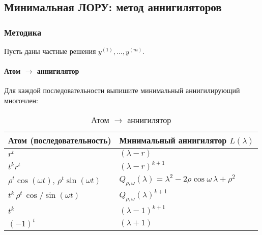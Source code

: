 \subsection{Минимальная ЛОРУ: метод аннигиляторов}\label{sec:min-lre}


\subsubsection*{Методика}

Пусть даны частные решения $y^{(1)},\ldots,y^{(m)}$.

\paragraph{Атом $\to$ аннигилятор}
Для каждой последовательности выпишите минимальный аннигилирующий многочлен:
\begin{table}[h!]
\centering
\caption{Атом $\to$ аннигилятор}
\label{tab:atom-to-annihilator}
\begin{tabular}{|l|l|}
\hline
\textbf{Атом (последовательность)} & \textbf{Минимальный аннигилятор $L(\lambda)$} \\
\hline
$r^t$ & $(\lambda - r)$ \\
\hline
$t^k r^t$ & $(\lambda - r)^{k+1}$ \\
\hline
$\rho^t \cos(\omega t)$, $\rho^t \sin(\omega t)$ & $Q_{\rho,\omega}(\lambda)=\lambda^2-2\rho\cos\omega\,\lambda+\rho^2$ \\
\hline
$t^k \, \rho^t \, \cos/\sin(\omega t)$ & $Q_{\rho,\omega}(\lambda)^{k+1}$ \\
\hline
$t^k$ & $(\lambda-1)^{k+1}$ \\
\hline
$(-1)^t$ & $(\lambda+1)$ \\
\hline
\end{tabular}
\end{table}

